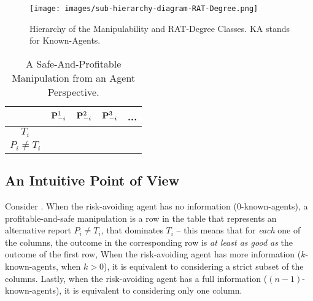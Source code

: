 \begin{figure}[t]
    \centering
    \texttt{[image: images/sub-hierarchy-diagram-RAT-Degree.png]}
    \caption{Hierarchy of the Manipulability and RAT-Degree Classes. KA stands for Known-Agents.}
    \label{fig:hierarchy-RAT-Degree}
\end{figure}



\begin{wraptable}{r}{5cm}
    \centering
    \begin{tabular}{c|c|c|c|c}
         & $\mathbf{P}_{-i}^1$ & $\mathbf{P}_{-i}^2$ & $\mathbf{P}_{-i}^3$ &... \\
         \hline
         $T_i$ & & &\\
         \hline
         $P_i \neq T_i$ & & &\\
    \end{tabular}
    \caption{
    \label{tab:safe-manip-i}
    A Safe-And-Profitable Manipulation from an Agent Perspective.}
\end{wraptable}
\subsection{An Intuitive Point of View}
Consider . 
When the risk-avoiding agent has no information ($0$-known-agents), a profitable-and-safe manipulation is a row in the table that represents an alternative report $P_i \neq T_i$, that dominates $T_i$ -- this means that for \emph{each} one of the columns, the outcome in the corresponding row is \emph{at least as good as} the outcome of the first row, 
When the risk-avoiding agent has more information ($k$-known-agents, when $k >0$), it is equivalent to considering a strict subset of the columns.
Lastly, when the risk-avoiding agent has a full information ($(n-1)$-known-agents), it is equivalent to considering only one column.
